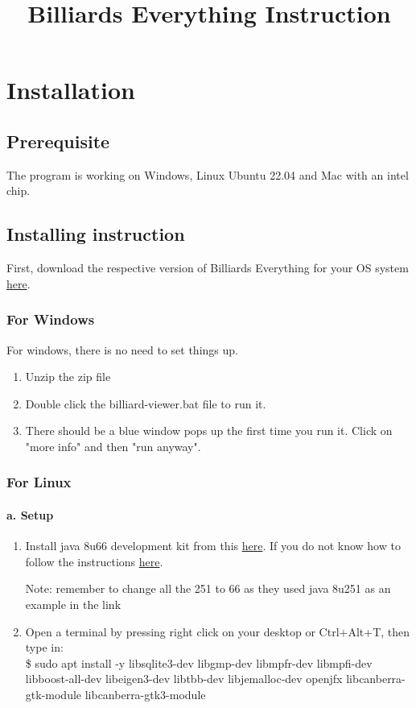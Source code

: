 \documentclass[11pt]{report}
\title{\textbf{Billiards Everything Instruction}}
\author{}
\date{}
\begin{document}
\maketitle
\tableofcontents
\newpage
\chapter{Installation}
\section{Prerequisite}
The program is working on Windows, Linux Ubuntu 22.04 and Mac with an intel chip.
\section{Installing instruction}
First, download the respective version of Billiards Everything for your OS system 
\href{https://sourceforge.net/projects/billiards-everything}{here}.
\subsection{For Windows}
For windows, there is no need to set things up.
\begin{enumerate}[Step 1.]
  \item Unzip the zip file
  \item Double click the billiard-viewer.bat file to run it.
  \item There should be a blue window pops up the first time you run it. Click on "more info" and then "run anyway". 
\end{enumerate}
\subsection{For Linux}
\subsubsection*{a. Setup}
\begin{enumerate}[Step 1.]
  \item Install java 8u66 development kit from this \href{https://www.oracle.com/ca-en/java/technologies/javase/javase8-archive-downloads.html}{here}. 
  If you do not know how to follow the instructions \href{https://www.fosstechnix.com/install-oracle-java-8-on-ubuntu-20-04/}{here}. 
  
  Note: remember to change all the 251 to 66 as they used java 8u251 as an example in the link
  \item Open a terminal by pressing right click on your desktop or Ctrl+Alt+T, 
  then type in: \\
  \$ sudo apt install -y libsqlite3-dev libgmp-dev libmpfr-dev libmpfi-dev libboost-all-dev libeigen3-dev libtbb-dev libjemalloc-dev openjfx libcanberra-gtk-module libcanberra-gtk3-module
\end{enumerate}
\end{document}
